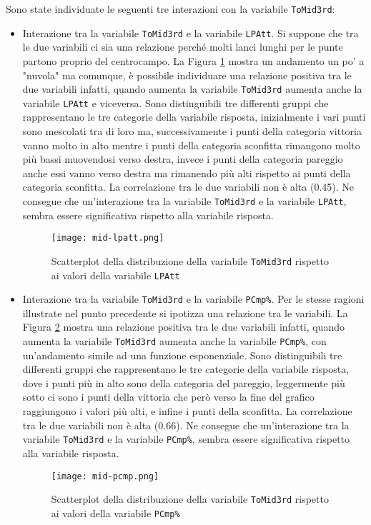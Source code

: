Sono state individuate le seguenti tre interazioni con la variabile \texttt{ToMid3rd}:
\begin{itemize}
	\item Interazione tra la variabile \texttt{ToMid3rd} e la variabile \texttt{LPAtt}. Si suppone che tra le due variabili ci sia una relazione perché molti lanci lunghi per le punte partono proprio del centrocampo. La Figura \ref{fig:midl} mostra un andamento un po' a "nuvola" ma comunque, è possibile individuare una relazione positiva tra le due variabili infatti, quando aumenta la variabile \texttt{ToMid3rd} aumenta anche la variabile \texttt{LPAtt} e viceversa. Sono distinguibili tre differenti gruppi che rappresentano le tre categorie della variabile risposta, inizialmente i vari punti sono mescolati tra di loro ma, successivamente i punti della categoria vittoria vanno molto in alto mentre i punti della categoria sconfitta rimangono molto più bassi muovendosi verso destra, invece i punti della categoria pareggio anche essi vanno verso destra ma rimanendo più alti rispetto ai punti della categoria sconfitta. La correlazione tra le due variabili non è alta (0.45). Ne consegue che un'interazione tra la variabile \texttt{ToMid3rd} e la variabile \texttt{LPAtt}, sembra essere significativa rispetto alla variabile risposta.
	\begin{figure}[htbp]
		\begin{center}
			\texttt{[image: mid-lpatt.png]}
			\caption{Scatterplot della distribuzione della variabile \texttt{ToMid3rd} rispetto ai valori della variabile \texttt{LPAtt}}  \label{fig:midl}
		\end{center}
	\end{figure}
	
	\item Interazione tra la variabile \texttt{ToMid3rd} e la variabile \texttt{PCmp\%}. Per le stesse ragioni illustrate nel punto precedente si ipotizza una relazione tra le variabili. La Figura \ref{fig:midp} mostra una relazione positiva tra le due variabili infatti, quando aumenta la variabile \texttt{ToMid3rd} aumenta anche la variabile \texttt{PCmp\%}, con un'andamento simile ad una funzione esponenziale. Sono distinguibili tre differenti gruppi che rappresentano le tre categorie della variabile risposta, dove i punti più in alto sono della categoria del pareggio, leggermente più sotto ci sono i punti della vittoria che però verso la fine del grafico raggiungono i valori più alti, e infine i punti della sconfitta. La correlazione tra le due variabili non è alta (0.66). Ne consegue che un'interazione tra la variabile \texttt{ToMid3rd} e la variabile \texttt{PCmp\%}, sembra essere significativa rispetto alla variabile risposta.
	
	\begin{figure}[htbp]
		\begin{center}
			\texttt{[image: mid-pcmp.png]}
			\caption{Scatterplot della distribuzione della variabile \texttt{ToMid3rd} rispetto ai valori della variabile \texttt{PCmp\%}}  \label{fig:midp}
		\end{center}
	\end{figure}
\end{itemize}


